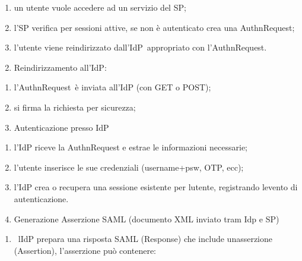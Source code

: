 \documentclass[
]{article}
\providecommand{\tightlist}{%
  \setlength{\itemsep}{0pt}\setlength{\parskip}{0pt}}
\begin{document}
\begin{enumerate}
\tightlist
\item
  {un utente vuole accedere ad un servizio del SP;}
\item
  {l'SP verifica per sessioni attive, se non è autenticato crea una
  }{AuthnRequest}{;}
\item
  {l'utente viene reindirizzato }{dall'IdP}{~appropriato con
  }{l'}{AuthnRequest}{.}
\end{enumerate}

{}

\begin{enumerate}
\setcounter{enumi}{1}
\tightlist
\item
  {Reindirizzamento }{all'IdP:}
\end{enumerate}

\begin{enumerate}
\tightlist
\item
  {l'}{AuthnRequest}{~è inviata all'IdP (con GET o POST);}
\item
  {si firma la richiesta per sicurezza;}
\end{enumerate}

{}

\begin{enumerate}
\setcounter{enumi}{2}
\tightlist
\item
  {Autenticazione presso IdP}
\end{enumerate}

\begin{enumerate}
\tightlist
\item
  {l'IdP riceve la AuthnRequest e estrae le informazioni necessarie;}
\item
  {l'utente inserisce le sue credenziali (username+psw, OTP, ecc);}
\item
  {l'\textquotesingle IdP crea o recupera una sessione esistente per
  l\textquotesingle utente, registrando l\textquotesingle evento di
  autenticazione.}
\end{enumerate}

{}

\begin{enumerate}
\setcounter{enumi}{3}
\tightlist
\item
  {Generazione Asserzione SAML }{(documento XML inviato tram Idp e SP)}
\end{enumerate}

\begin{enumerate}
\tightlist
\item
  {~l\textquotesingle IdP prepara una risposta SAML (Response) che
  include un\textquotesingle asserzione (Assertion), l'asserzione può
  contenere:}
\end{enumerate}
\end{document}
